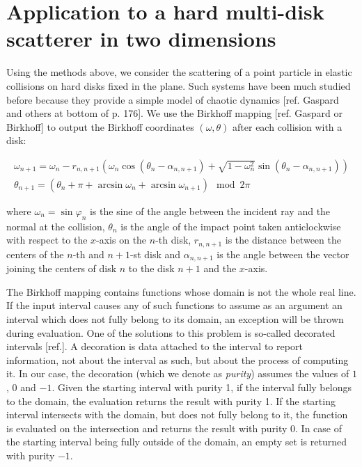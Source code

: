 \documentclass[pre, amsmath, amssymb, onecolumn, showpacs]{revtex4-1}
\begin{document}
\section{Application to a hard multi-disk scatterer in two dimensions}

Using the methods above, we consider the scattering of a point particle in elastic collisions on hard disks fixed in the plane. Such systems have been much studied before because they provide a simple model of chaotic dynamics [ref. Gaspard and others at bottom of p. 176]. We use the Birkhoff mapping [ref. Gaspard or Birkhoff] to output the Birkhoff coordinates $(\omega, \theta)$ after each collision with a disk:

\begin{equation}
\begin{split}
\omega_{n+1} = \omega_n - r_{n, n+1} (\omega_n \cos(\theta_n - \alpha_{n, n+1}) + \sqrt{1 - \omega_n^2} \sin(\theta_n - \alpha_{n, n+1})) \\
\theta_{n+1} = (\theta_n + \pi + \arcsin \omega_n + \arcsin \omega_{n+1}) \mod 2 \pi
\end{split}
\end{equation}

where $\omega_n = \sin \varphi_n$ is the sine of the angle between the incident ray and the normal at the collision, $\theta_n$ is the angle of the impact point taken anticlockwise with respect to the $x$-axis on the $n$-th disk, $r_{n, n+1}$ is the distance between the centers of the $n$-th and $n+1$-st disk and $\alpha_{n, n+1}$ is the angle between the vector joining the centers of disk $n$ to the disk $n+1$ and the $x$-axis.

The Birkhoff mapping contains functions whose domain is not the whole real line. If the input interval causes any of such functions to assume as an argument an interval which does not fully belong to its domain, an exception will be thrown during evaluation. One of the solutions to this problem is so-called decorated intervals [ref.]. A decoration is data attached to the interval to report information, not about the interval as such, but about the process of computing it. In our case, the decoration (which we denote as \textit{purity}) assumes the values of $1$, $0$ and $-1$. Given the starting interval with purity 1, if the interval fully belongs to the domain, the evaluation returns the result with purity 1. If the starting interval intersects with the domain, but does not fully belong to it, the function is evaluated on the intersection and returns the result with purity 0. In case of the starting interval being fully outside of the domain, an empty set is returned with purity $-1$.
\end{document}

